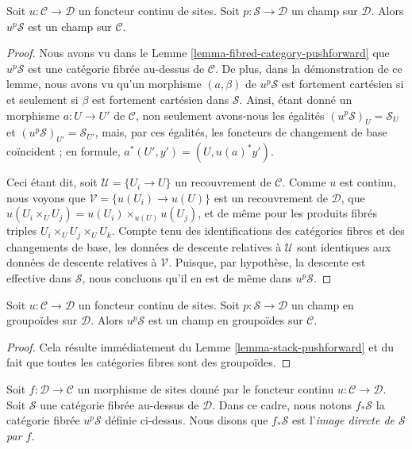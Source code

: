 \begin{lemma}
\label{lemma-stack-pushforward}
Soit $u : \mathcal{C} \to \mathcal{D}$ un foncteur continu de sites.
Soit $p : \mathcal{S} \to \mathcal{D}$ un champ sur $\mathcal{D}$.
Alors $u^p\mathcal{S}$ est un champ sur $\mathcal{C}$.
\end{lemma}

\begin{proof}
Nous avons vu dans le
Lemme \ref{lemma-fibred-category-pushforward}
que $u^p\mathcal{S}$ est une catégorie fibrée au-dessus de $\mathcal{C}$.
De plus, dans la démonstration de ce lemme, nous avons vu qu'un morphisme
$(a, \beta)$ de $u^p\mathcal{S}$ est fortement cartésien si et seulement si
$\beta$ est fortement cartésien dans $\mathcal{S}$. Ainsi, étant donné
un morphisme $a : U \to U'$ de $\mathcal{C}$, non seulement
avons-nous les égalités
$(u^p\mathcal{S})_U = \mathcal{S}_U$ et
$(u^p\mathcal{S})_{U'} = \mathcal{S}_{U'}$, mais, par ces
égalités, les foncteurs de changement de base coïncident ; en formule,
$a^*(U', y') = (U, u(a)^*y')$.

\medskip\noindent
Ceci étant dit, soit $\mathcal{U} = \{U_i \to U\}$ un recouvrement
de $\mathcal{C}$. Comme $u$ est continu, nous voyons que
$\mathcal{V} = \{u(U_i) \to u(U)\}$ est un recouvrement de $\mathcal{D}$,
que $u(U_i \times_U U_j) = u(U_i) \times_{u(U)} u(U_j)$, et de même
pour les produits fibrés triples $U_i \times_U U_j \times_U U_k$.
Compte tenu des identifications des catégories fibres et des changements de base,
les données de descente relatives à $\mathcal{U}$ sont identiques
aux données de descente relatives à $\mathcal{V}$. Puisque, par hypothèse, la descente
est effective dans $\mathcal{S}$, nous concluons qu'il en est de même dans
$u^p\mathcal{S}$.
\end{proof}

\begin{lemma}
\label{lemma-stack-in-groupoids-pushforward}
Soit $u : \mathcal{C} \to \mathcal{D}$ un foncteur continu de sites.
Soit $p : \mathcal{S} \to \mathcal{D}$ un champ en groupoïdes
sur $\mathcal{D}$. Alors $u^p\mathcal{S}$ est un champ en groupoïdes
sur $\mathcal{C}$.
\end{lemma}

\begin{proof}
Cela résulte immédiatement du
Lemme \ref{lemma-stack-pushforward}
et du fait que toutes les catégories fibres sont des groupoïdes.
\end{proof}

\begin{definition}
\label{definition-pushforward-stack}
Soit $f : \mathcal{D} \to \mathcal{C}$ un morphisme de sites
donné par le foncteur continu $u : \mathcal{C} \to \mathcal{D}$.
Soit $\mathcal{S}$ une catégorie fibrée au-dessus de $\mathcal{D}$.
Dans ce cadre, nous notons {\it $f_*\mathcal{S}$} la catégorie
fibrée $u^p\mathcal{S}$ définie ci-dessus. Nous disons que
$f_*\mathcal{S}$ est l'{\it image directe de $\mathcal{S}$ par $f$}.
\end{definition}

